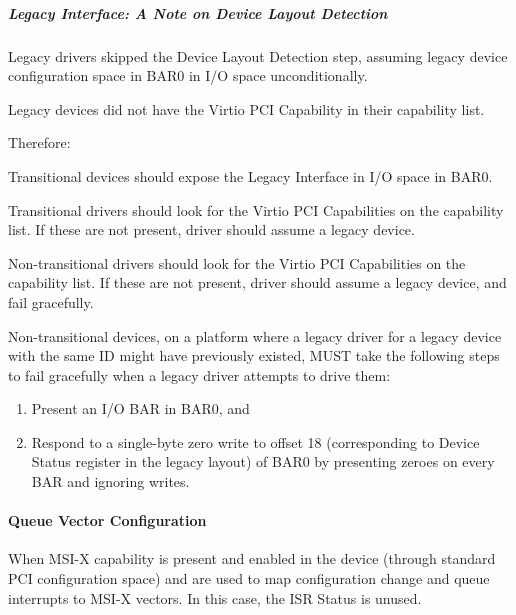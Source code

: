 \subparagraph{Legacy Interface: A Note on Device Layout Detection}\label{sec:Virtio Transport Options / Virtio Over PCI Bus / PCI-specific Initialization And Device Operation / Device Initialization / Virtio Device Configuration Layout Detection / Legacy Interface: A Note on Device Layout Detection}

Legacy drivers skipped the Device Layout Detection step, assuming legacy
device configuration space in BAR0 in I/O space unconditionally.

Legacy devices did not have the Virtio PCI Capability in their
capability list.

Therefore:

Transitional devices should expose the Legacy Interface in I/O
space in BAR0.

Transitional drivers should look for the Virtio PCI
Capabilities on the capability list.
If these are not present, driver should assume a legacy device.

Non-transitional drivers should look for the Virtio PCI
Capabilities on the capability list.
If these are not present, driver should assume a legacy device,
and fail gracefully.

Non-transitional devices, on a platform where a legacy driver for
a legacy device with the same ID might have previously existed,
MUST take the following steps to fail gracefully when a legacy
driver attempts to drive them:

\begin{enumerate}
\item Present an I/O BAR in BAR0, and
\item Respond to a single-byte zero write to offset 18
   (corresponding to Device Status register in the legacy layout)
   of BAR0 by presenting zeroes on every BAR and ignoring writes.
\end{enumerate}

\paragraph{Queue Vector Configuration}\label{sec:Virtio Transport Options / Virtio Over PCI Bus / PCI-specific Initialization And Device Operation / Device Initialization / Queue Vector Configuration}

When MSI-X capability is present and enabled in the device
(through standard PCI configuration space)  and  are used to map configuration change and queue
interrupts to MSI-X vectors. In this case, the ISR Status is unused.

